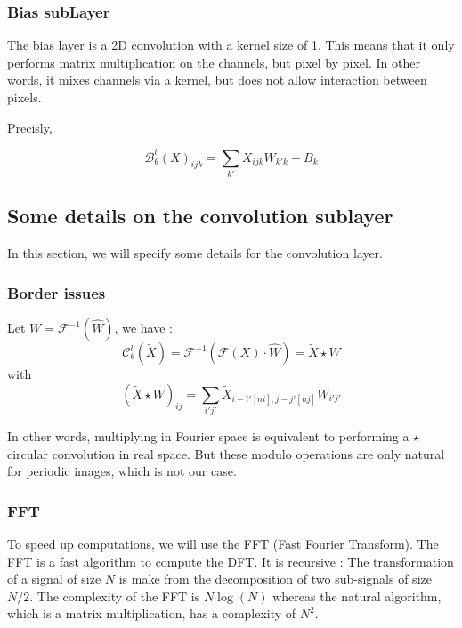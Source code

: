 \subsubsection{Bias subLayer} \label{FNO.bias_sublayer}

The bias layer is a 2D convolution with a kernel size of 1. This means that it only performs matrix multiplication on the channels, but pixel by pixel. In other words, it mixes channels via a kernel, but does not allow interaction between pixels.

Precisly,

\begin{equation*}
	\mathcal{B}_\theta^l(X)_{ijk}=\sum_{k'}X_{ijk}W_{k'k}+B_k
\end{equation*}

\subsection{Some details on the convolution sublayer} \label{FNO.details_conv}

In this section, we will specify some details for the convolution layer.

\subsubsection{Border issues}

Let $W=\mathcal{F}^{-1}(\hat{W})$, we have :
\begin{equation*}
	\mathcal{C}_\theta^l(\tilde{X})=\mathcal{F}^{-1}\left(\mathcal{F}(X)\cdot\hat{W}\right)=\tilde{X}\star W
\end{equation*}
with
\begin{equation*}
	(\tilde{X}\star W)_{ij}=\sum_{i'j'}\tilde{X}_{i-i'[ni],j-j'[nj]}W_{i'j'}
\end{equation*}

In other words, multiplying in Fourier space is equivalent to performing a $\star$ circular convolution in real space. But these modulo operations are only natural for periodic images, which is not our case. 

\subsubsection{FFT}

To speed up computations, we will use the FFT (Fast Fourier Transform). The FFT is a fast algorithm to compute the DFT. It is recursive : The transformation of a signal of size $N$ is make from the decomposition of two sub-signals of size $N/2$. The complexity of the FFT is $N\log(N)$ whereas the natural algorithm, which is a matrix multiplication, has a complexity of $N^2$.

